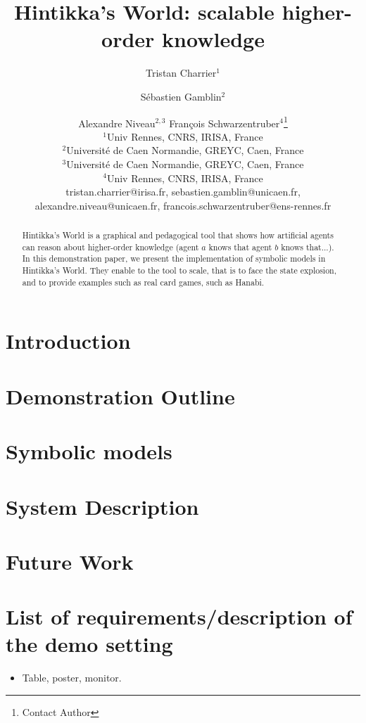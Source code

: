 \documentclass{article}
\title{Hintikka's World: scalable higher-order knowledge}
\author{
Tristan Charrier$^1$\and
Sébastien Gamblin$^2$\and
Alexandre Niveau$^{2,3}$\And
François Schwarzentruber$^4$\footnote{Contact Author}\\
\affiliations
$^1$Univ Rennes, CNRS, IRISA, France\\
$^2$Université de Caen Normandie, GREYC, Caen, France\\
$^3$Université de Caen Normandie, GREYC, Caen, France\\
$^4$Univ Rennes, CNRS, IRISA, France\\
\emails
tristan.charrier@irisa.fr, 
sebastien.gamblin@unicaen.fr,
alexandre.niveau@unicaen.fr,
francois.schwarzentruber@ens-rennes.fr
}
\begin{document}
\newcommand{\mettel}{\textsf{MetTeL2}\xspace}

\maketitle

\begin{abstract}
	Hintikka's World is a graphical and pedagogical tool that shows how artificial agents can reason about higher-order knowledge (agent $a$ knows that agent $b$ knows that...).
	In this demonstration paper, we present the implementation of symbolic models in Hintikka's World. They enable to the tool to scale, that is to face the state explosion, and to provide examples such as real card games, such as Hanabi.
\end{abstract}



\section{Introduction}


\section{Demonstration Outline}
\label{section:demonstration}



\section{Symbolic models}
\label{section:symbolicmodels}








\section{System Description}
\label{section:architecture}


\section{Future Work}
\label{section:perspectives}











\newpage







\newpage

\section*{List of requirements/description of the demo setting}

\begin{itemize}
	\item Table, poster, monitor.
\end{itemize}
\end{document}
